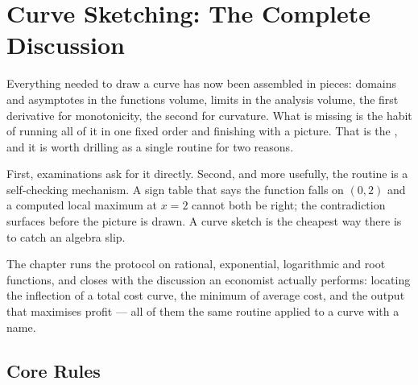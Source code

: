 \chapter{Curve Sketching: The Complete Discussion}

Everything needed to draw a curve has now been assembled in pieces:
domains and asymptotes in the functions volume, limits in the analysis
volume, the first derivative for monotonicity, the second for curvature.
What is missing is the habit of running all of it in one fixed order and
finishing with a picture. That is the , and it is worth
drilling as a single routine for two reasons.

First, examinations ask for it directly. Second, and more usefully, the
routine is a self-checking mechanism. A sign table that says the function
falls on $(0,2)$ and a computed local maximum at $x=2$ cannot both be right;
the contradiction surfaces before the picture is drawn. A curve sketch is
the cheapest way there is to catch an algebra slip.

The chapter runs the protocol on rational, exponential, logarithmic and root
functions, and closes with the discussion an economist actually performs:
locating the inflection of a total cost curve, the minimum of average cost,
and the output that maximises profit --- all of them the same routine
applied to a curve with a name.

\section{Core Rules}

